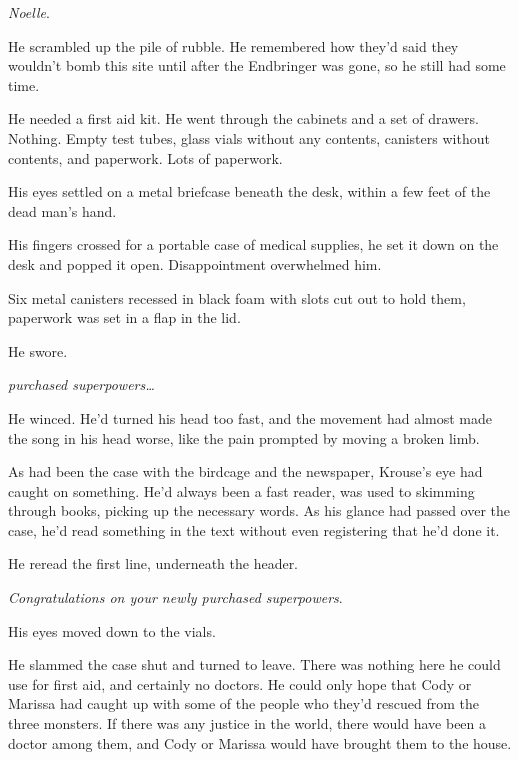 \emph{Noelle}.



He scrambled up the pile of rubble.  He remembered how they'd said they wouldn't bomb this site until after the Endbringer was gone, so he still had some time.



He needed a first aid kit.  He went through the cabinets and a set of drawers.  Nothing.  Empty test tubes, glass vials without any contents, canisters without contents, and paperwork.  Lots of paperwork.



His eyes settled on a metal briefcase beneath the desk, within a few feet of the dead man's hand.



His fingers crossed for a portable case of medical supplies, he set it down on the desk and popped it open.  Disappointment overwhelmed him.



Six metal canisters recessed in black foam with slots cut out to hold them, paperwork was set in a flap in the lid.



He swore.



\emph{\ldotsnewly purchased superpowers\ldots}



He winced.  He'd turned his head too fast, and the movement had almost made the song in his head worse, like the pain prompted by moving a broken limb.



As had been the case with the birdcage and the newspaper, Krouse's eye had caught on something.  He'd always been a fast reader, was used to skimming through books, picking up the necessary words.  As his glance had passed over the case, he'd read something in the text without even registering that he'd done it.



He reread the first line, underneath the header.



\emph{Congratulations on your newly purchased superpowers}.



His eyes moved down to the vials.



He slammed the case shut and turned to leave.  There was nothing here he could use for first aid, and certainly no doctors.  He could only hope that Cody or Marissa had caught up with some of the people who they'd rescued from the three monsters.  If there was any justice in the world, there would have been a doctor among them, and Cody or Marissa would have brought them to the house.



